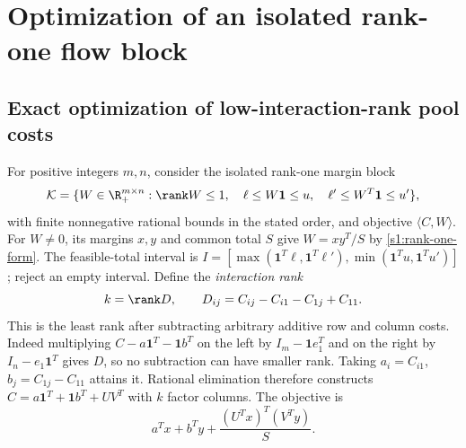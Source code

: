 \section{Optimization of an isolated rank-one flow block}\label{app:costs}

\subsection{Exact optimization of low-interaction-rank pool costs}
\label{s6:low-rank}
For positive integers $m,n$, consider the isolated rank-one margin block
\begin{equation}
 \mathcal K=\{W\in\R_+^{m\times n}:\rank W\le1,\quad
 \ell\le W\mathbf1\le u,\quad
 \ell'\le W^T\mathbf1\le u'\},\label{s6:margin-block}
\end{equation}
with finite nonnegative rational bounds in the stated order, and objective
$\langle C,W\rangle$. For $W\ne0$, its margins $x,y$ and common total
$S$ give $W=xy^T/S$ by \eqref{s1:rank-one-form}.
The feasible-total interval is
$I=[\max(\mathbf1^T\ell,\mathbf1^T\ell'),
\min(\mathbf1^Tu,\mathbf1^Tu')]$; reject an empty interval.
Define the \emph{interaction rank}
\[
 k=\rank D,\qquad D_{ij}=C_{ij}-C_{i1}-C_{1j}+C_{11}.
\]
This is the least rank after subtracting arbitrary additive row and
column costs. Indeed multiplying $C-a\mathbf1^T-\mathbf1b^T$ on the
left by $I_m-\mathbf1e_1^T$ and on the right by $I_n-e_1\mathbf1^T$
gives $D$, so no subtraction can have smaller rank. Taking
$a_i=C_{i1}$, $b_j=C_{1j}-C_{11}$ attains it.
Rational elimination therefore constructs
$C=a\mathbf1^T+\mathbf1b^T+UV^T$ with $k$ factor columns.
The objective is
\begin{equation}
 a^Tx+b^Ty+\frac{(U^Tx)^T(V^Ty)}S.\label{s6:interaction-objective}
\end{equation}

